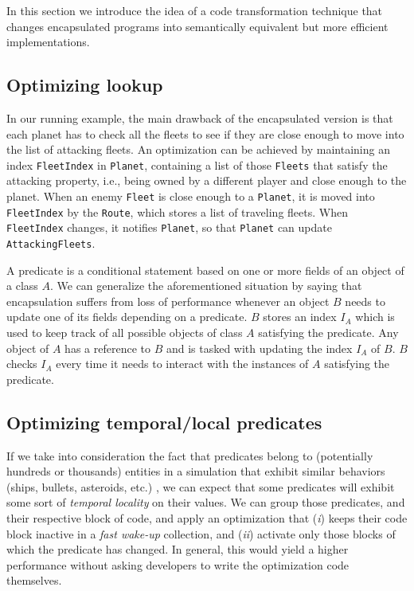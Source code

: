 In this section we introduce the idea of a code transformation technique that changes encapsulated programs into semantically equivalent but more efficient implementations.

\subsection{Optimizing lookup}

In our running example, the main drawback of the encapsulated version is that each planet has to check all the fleets to see if they are close enough to move into the list of attacking fleets. An optimization can be achieved by maintaining an index \texttt{FleetIndex} in \texttt{Planet}, containing a list of those \texttt{Fleets} that satisfy the attacking property, i.e., being owned by a different player and close enough to the planet. When an enemy \texttt{Fleet} is close enough to a \texttt{Planet}, it is moved into \texttt{FleetIndex} by the \texttt{Route}, which stores a list of traveling fleets. When \texttt{FleetIndex} changes, it notifies \texttt{Planet}, so that \texttt{Planet} can update \texttt{AttackingFleets}.

A predicate is a conditional statement based on one or more fields of an object of a class $A$. We can generalize the aforementioned situation by saying that encapsulation suffers from loss of performance whenever an object $B$ needs to update one of its fields depending on a predicate. $B$ stores an index $I_{A}$ which is used to keep track of all possible objects of class $A$ satisfying the predicate. Any object of $A$ has a reference to $B$ and is tasked with updating the index $I_{A}$ of $B$. $B$ checks $I_{A}$ every time it needs to interact with the instances of $A$ satisfying the predicate.

\subsection{Optimizing temporal/local predicates}

If we take into consideration the fact that predicates belong to (potentially hundreds or thousands) entities in a simulation that exhibit similar behaviors (ships, bullets, asteroids, etc.) \cite{ai_dithering}, we can expect that some predicates will exhibit some sort of \textit{temporal locality} on their values. We can group those predicates, and their respective block of code, and apply an optimization that (\textit{i}) keeps their code block inactive in a \textit{fast wake-up} collection, and (\textit{ii}) activate only those blocks of which the predicate has changed. In general, this would yield a higher performance without asking developers to write the optimization code themselves.

